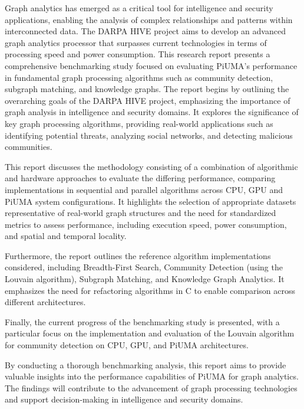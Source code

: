 \documentclass[letterpaper, 10pt]{article}
\begin{document}
\abstractname{}
\newline\par
\setlength{\parindent}{20pt}
Graph analytics has emerged as a critical tool for intelligence and security applications, enabling the analysis of complex relationships and patterns within interconnected data. The DARPA HIVE project aims to develop an advanced graph analytics processor that surpasses current technologies in terms of processing speed and power consumption. This research report presents a comprehensive benchmarking study focused on evaluating PiUMA's performance in fundamental graph processing algorithms such as community detection, subgraph matching, and knowledge graphs.
The report begins by outlining the overarching goals of the DARPA HIVE project, emphasizing the importance of graph analysis in intelligence and security domains. It explores the significance of key graph processing algorithms, providing real-world applications such as identifying potential threats, analyzing social networks, and detecting malicious communities. 

 This report discusses the methodology consisting of a combination of algorithmic and hardware approaches to evaluate the differing performance, comparing implementations in sequential and parallel algorithms across CPU, GPU and PiUMA system configurations. It highlights the selection of appropriate datasets representative of real-world graph structures and the need for standardized metrics to assess performance, including execution speed, power consumption, and spatial and temporal locality.

Furthermore, the report outlines the reference algorithm implementations considered, including Breadth-First Search, Community Detection (using the Louvain algorithm), Subgraph Matching, and Knowledge Graph Analytics. It emphasizes the need for refactoring algorithms in C to enable comparison across different architectures.

Finally, the current progress of the benchmarking study is presented, with a particular focus on the implementation and evaluation of the Louvain algorithm for community detection on CPU, GPU, and PiUMA architectures.

By conducting a thorough benchmarking analysis, this report aims to provide valuable insights into the performance capabilities of PiUMA for graph analytics. The findings will contribute to the advancement of graph processing technologies and support decision-making in intelligence and security domains.
\end{document}
